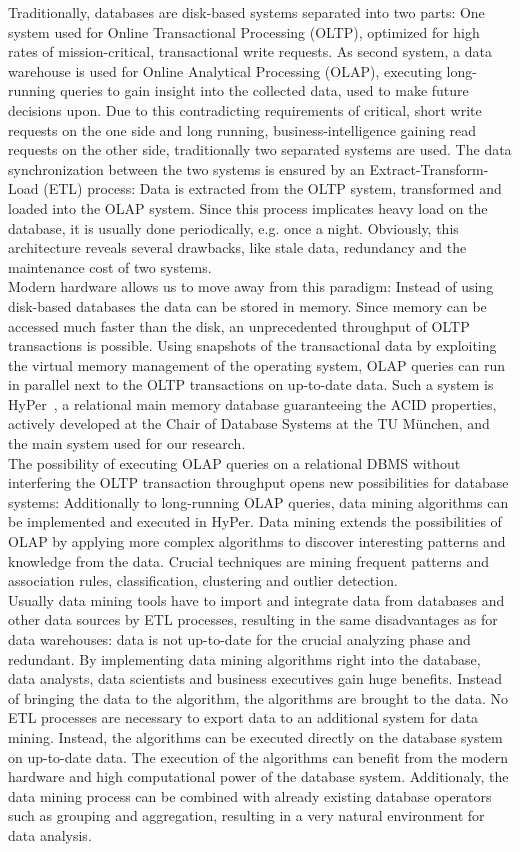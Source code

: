 Traditionally, databases are disk-based systems separated into two parts: One system used for Online Transactional Processing (OLTP), optimized for high rates of mission-critical, transactional write requests. As second system, a data warehouse is used for Online Analytical Processing (OLAP), executing long-running queries to gain insight into the  collected data, used to make future decisions upon. Due to this contradicting requirements of critical, short write requests on the one side and long running, business-intelligence gaining read requests on the other side, traditionally two separated systems are used. The data synchronization between the two systems is ensured by an Extract-Transform-Load (ETL) process: Data is extracted from the OLTP system, transformed and loaded into the OLAP system. Since this process implicates heavy load on the database, it is usually done periodically, e.g. once a night. Obviously, this architecture reveals several drawbacks, like stale data, redundancy and the maintenance cost of two systems.
\\
Modern hardware allows us to move away from this paradigm: Instead of using disk-based databases the data can be stored in memory. Since memory can be accessed much faster than the disk, an unprecedented throughput of OLTP transactions is possible. Using snapshots of the transactional data by exploiting the virtual memory management of the operating system, OLAP queries can run in parallel next to the OLTP transactions on up-to-date data. Such a system is HyPer~\parencite{5767867}, a relational main memory database guaranteeing the ACID properties, actively developed at the Chair of Database Systems at the TU München, and the main system used for our research. 
\\
The possibility of executing OLAP queries on a relational DBMS without interfering the OLTP transaction throughput opens new possibilities for database systems: Additionally to long-running OLAP queries, data mining algorithms can be implemented and executed in HyPer. Data mining extends the possibilities of OLAP by applying more complex algorithms to discover interesting patterns and knowledge from the data. Crucial techniques are mining frequent patterns and association rules, classification, clustering and outlier detection.
\\
Usually data mining tools have to import and integrate data from databases and other data sources by ETL processes, resulting in the same disadvantages as for data warehouses: data is not up-to-date for the crucial analyzing phase and redundant. 
By implementing data mining algorithms right into the database, data analysts, data scientists and business executives gain huge benefits. Instead of bringing the data to the algorithm, the algorithms are brought to the data. No ETL processes are necessary to export data to an additional system for data mining. Instead, the algorithms can be executed directly on the database system on up-to-date data. The execution of the algorithms can benefit from the modern hardware and high computational power of the database system. Additionaly, the data mining process can be combined with already existing database operators such as grouping and aggregation, resulting in a very natural environment for data analysis.


